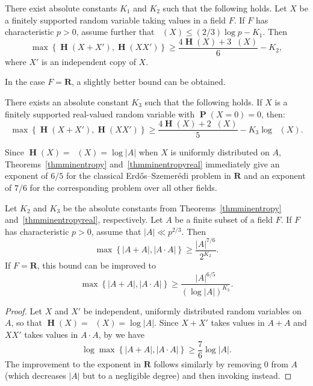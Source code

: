 \documentclass[twoside, 10pt]{article}
\DeclareMathOperator{\Eta}{\mathbf{H}}
\DeclareMathOperator{\Etamin}{\mathbf{H}_\infty}
\DeclareMathOperator{\pr}{\mathbf{P}}
\newcommand{\RR}{\mathbf{R}}   %
\begin{document}
\begin{theorem}\label{thmminentropy}
There exist absolute constants $K_1$ and $K_2$ such that the following holds. Let $X$ be a finitely supported
random variable taking values in a field $F$. If $F$ has characteristic 
$p > 0$, assume further that $\Etamin(X) \leq (2/3)\log p - K_1 $. Then
$$ \max\left\{ \Eta(X+X'), \Eta( XX') \right\} \ge 
\frac{4 \Eta(X) + 3\Etamin(X)}{6} - K_2,$$
where $X'$ is an independent copy of $X$.
\end{theorem}

In the case $F=\RR$, a slightly better bound can be obtained.

\begin{theorem}\label{thmminentropyreal}
There exists an absolute constant $K_3$ such that the following holds. 
If $X$ is a finitely supported real-valued random variable with 
$\pr(X=0) = 0$, then:
$$\max\left\{ \Eta(X+X'), \Eta(XX')\right\}
\ge \frac{4\Eta(X) + 2\Etamin(X)}{5} - K_3 \log\Etamin(X) .$$
\end{theorem}

Since $\Eta(X) = \Etamin(X) = \log|A|$ when $X$ is uniformly
distributed on $A$, Theorems~\ref{thmminentropy} and~\ref{thmminentropyreal}
immediately give an exponent of $6/5$ for the classical 
Erd\H{o}s--Szemer\'edi problem in $\RR$ and an exponent 
of $7/6$ for the corresponding problem over all other fields.

\begin{corollary}\label{corclassicalsumproduct}
Let $K_2$ and $K_3$ be the absolute constants from Theorems~\ref{thmminentropy} and~\ref{thmminentropyreal}, respectively.
Let $A$ be a finite subset of a field $F$. If $F$ has characteristic $p>0$, assume that $|A|\ll p^{2/3}$. Then
$$\max\left\{ |A+A|, |A\cdot A|\right\}\ge \frac{|A|^{7/6}}{2^{K_2}}.$$
If $F = \RR$, this bound can be improved to
$$\max\left\{ |A+A|, |A\cdot A|\right\} \ge \frac{|A|^{6/5}}{(\log|A|)^{K_3}}.$$
\end{corollary}

\begin{proof}
Let $X$ and $X'$ be independent, uniformly distributed 
random variables on $A$, so that
$\Eta(X) = \Etamin(X) = \log|A|.$
Since $X+X'$ takes values in $A+A$ and $XX'$ takes values in $A\cdot A$, 
by 
we have
$$\log\max\left\{ |A+A|, |A\cdot A|\right\} \ge \frac76 \log |A|.$$
The improvement to the exponent in $\RR$ follows similarly by removing 
$0$ from $A$ (which decreases $|A|$ but to a negligible degree) 
and then invoking  instead.
\end{proof}
\end{document}
